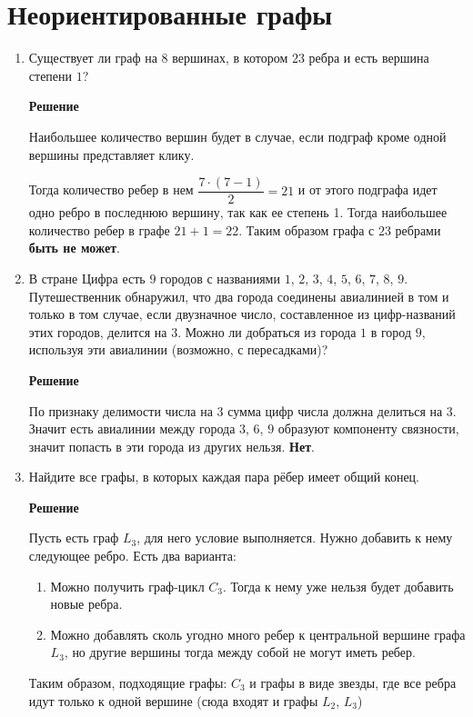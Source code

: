 \documentclass[12pt]{article}
\begin{document}
	\section{Неориентированные графы}
	\begin{enumerate}[label={\textbf{\arabic{section}.\arabic*}}]
		\item Существует ли граф на $8$ вершинах, в котором $23$ ребра и есть вершина степени $1$?
		
		\textbf{Решение}
		
		Наибольшее количество вершин будет в случае, если подграф кроме одной вершины представляет клику. 
		
		Тогда количество ребер в нем $\dfrac{7 \cdot (7-1)}{2} = 21$ и от этого подграфа идет одно ребро в последнюю вершину, так как ее степень 1. Тогда наибольшее количество ребер в графе $21+1 = 22$. Таким образом графа с $23$ ребрами \textbf{быть не может}.
		
		\item В стране Цифра есть $9$ городов с названиями $1$, $2$, $3$, $4$, $5$, $6$, $7$, $8$, $9$. Путешественник обнаружил, что два города соединены авиалинией в том и только в том случае, если двузначное число, составленное из цифр-названий этих городов, делится на $3$. Можно ли добраться из города $1$ в город $9$, используя эти авиалинии (возможно, с пересадками)?
		
		\textbf{Решение}
		
		По признаку делимости числа на $3$ сумма цифр числа должна делиться на $3$. Значит есть авиалинии между города $3$, $6$, $9$ образуют компоненту связности, значит попасть в эти города из других нельзя. \textbf{Нет}.
		
		\item Найдите все графы, в которых каждая пара рёбер имеет общий конец.
		
		\textbf{Решение}
		
		Пусть есть граф $L_3$, для него условие выполняется. Нужно добавить к нему следующее ребро. Есть два варианта:
		\begin{enumerate}
			\item Можно получить граф-цикл $C_3$. Тогда к нему уже нельзя будет добавить новые ребра.
			\item Можно добавлять сколь угодно много ребер к центральной вершине графа $L_3$, но другие вершины тогда между собой не могут иметь ребер.
		\end{enumerate}
		Таким образом, подходящие графы: $C_3$ и графы в виде звезды, где все ребра идут только к одной вершине (сюда входят и графы $L_2$, $L_3$)
		

\end{enumerate}
\end{document}
